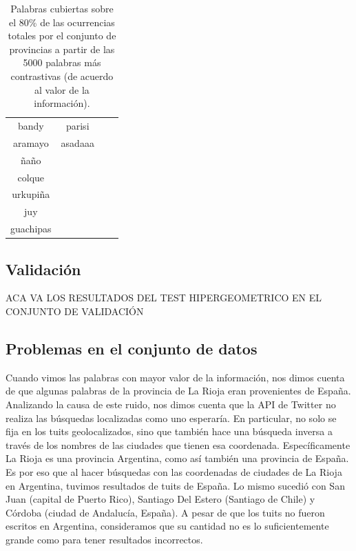 \begin{table}[]
{\begin{tabular}{|c|c|c|c|}
bandy       & parisi           &                                &                            \\
aramayo     & asadaaa          &                                &                            \\
ñaño        &                  &                                &                            \\
colque      &                  &                                &                            \\
urkupiña    &                  &                                &                            \\
juy         &                  &                                &                            \\
guachipas   &                  &                                &                            \\ \hline
\end{tabular}%
}
\caption{Palabras cubiertas sobre el 80\% de las ocurrencias totales por el conjunto de provincias a partir de las 5000 palabras más contrastivas (de acuerdo al valor de la información).}
\label{tab:palabrasRegiones}
\end{table}


\subsection{Validación}
ACA VA LOS RESULTADOS DEL TEST HIPERGEOMETRICO EN EL CONJUNTO DE VALIDACIÓN

\subsection{Problemas en el conjunto de datos}
\label{sub:problemas_datos}

Cuando vimos las palabras con mayor valor de la información, nos dimos cuenta de que algunas palabras de la provincia de La Rioja eran provenientes de España. Analizando la causa de este ruido, nos dimos cuenta que la API de Twitter no realiza las búsquedas localizadas como uno esperaría. En particular, no solo se fija en los tuits geolocalizados, sino que también hace una búsqueda inversa a través de los nombres de las ciudades que tienen esa coordenada. Específicamente La Rioja es una provincia Argentina, como así también una provincia de España. Es por eso que al hacer búsquedas con las coordenadas de ciudades de La Rioja en Argentina, tuvimos resultados de tuits de España. Lo mismo sucedió con San Juan (capital de Puerto Rico), Santiago Del Estero (Santiago de Chile) y Córdoba (ciudad de Andalucía, España). A pesar de que los tuits no fueron escritos en Argentina, consideramos que su cantidad no es lo suficientemente grande como para tener resultados incorrectos.

